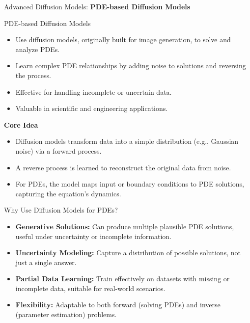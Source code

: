 \begin{frame}{}
    \LARGE Advanced Diffusion Models: \textbf{PDE-based Diffusion Models}
\end{frame}

\begin{frame}[allowframebreaks]{PDE-based Diffusion Models}
    \begin{itemize}
        \item Use diffusion models, originally built for image generation, to solve and analyze PDEs.
        \item Learn complex PDE relationships by adding noise to solutions and reversing the process.
        \item Effective for handling incomplete or uncertain data.
        \item Valuable in scientific and engineering applications.
    \end{itemize}

    \framebreak

    \textbf{Core Idea}
    \begin{itemize}
        \item Diffusion models transform data into a simple distribution (e.g., Gaussian noise) via a forward process.
        \item A reverse process is learned to reconstruct the original data from noise.
        \item For PDEs, the model maps input or boundary conditions to PDE solutions, capturing the equation's dynamics.
    \end{itemize}
\end{frame}

\begin{frame}{Why Use Diffusion Models for PDEs?}
    \begin{itemize}
        \item \textbf{Generative Solutions:} Can produce multiple plausible PDE solutions, useful under uncertainty or incomplete information.
        \item \textbf{Uncertainty Modeling:} Capture a distribution of possible solutions, not just a single answer.
        \item \textbf{Partial Data Learning:} Train effectively on datasets with missing or incomplete data, suitable for real-world scenarios.
        \item \textbf{Flexibility:} Adaptable to both forward (solving PDEs) and inverse (parameter estimation) problems.
    \end{itemize}
\end{frame}



